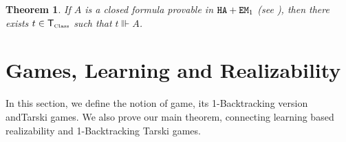 \documentclass[copyright,creativecommons]{eptcs}
\newcommand{\EM}                       { {\tt EM} }
\newcommand{\HA}                       { {\tt HA} }
\newcommand{\SystemT}                  {\mathsf{T}}
\newcommand{\Class}                    {\mbox{\tiny Class}}
\newcommand{\SystemTClass}             {{\SystemT_{\Class}}}
\newtheorem{theorem}{Theorem}
\begin{document}
\begin{theorem}\label{Realizability Theorem}
If $A$ is a closed formula provable in $\HA + \EM_1$ (see \cite{Aschieri}), then there
exists $t\in \SystemTClass$ such that $t\Vvdash A$.
\end{theorem}



\section{Games, Learning and Realizability}\label{gamesrealizability}
\label{section-GamesLearningandRealizability}

In this section, we define the notion of game, its 1-Backtracking version andTarski games. We also prove our main theorem, connecting learning based realizability and 1-Backtracking Tarski games. 
\end{document}
